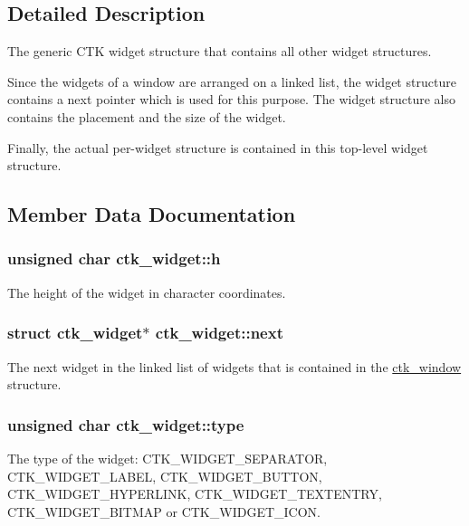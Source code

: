 \subsection{Detailed Description}
The generic C\+T\+K widget structure that contains all other widget structures.

Since the widgets of a window are arranged on a linked list, the widget structure contains a next pointer which is used for this purpose. The widget structure also contains the placement and the size of the widget.

Finally, the actual per-\/widget structure is contained in this top-\/level widget structure. 

\subsection{Member Data Documentation}
\hypertarget{structctk__widget_aceacf7e857117aff2c54a4c7c6441dac}{}
\subsubsection[{h}]{\setlength{\rightskip}{0pt plus 5cm}unsigned char ctk\+\_\+widget\+::h}\label{structctk__widget_aceacf7e857117aff2c54a4c7c6441dac}
The height of the widget in character coordinates. \hypertarget{structctk__widget_a3621ec9de98f2b90ec42cb2833d88423}{}
\subsubsection[{next}]{\setlength{\rightskip}{0pt plus 5cm}struct {\bf ctk\+\_\+widget}$\ast$ ctk\+\_\+widget\+::next}\label{structctk__widget_a3621ec9de98f2b90ec42cb2833d88423}
The next widget in the linked list of widgets that is contained in the \hyperlink{structctk__window}{ctk\+\_\+window} structure. \hypertarget{structctk__widget_a0313c4e5ca0a34104fc5514b6dd8d636}{}
\subsubsection[{type}]{\setlength{\rightskip}{0pt plus 5cm}unsigned char ctk\+\_\+widget\+::type}\label{structctk__widget_a0313c4e5ca0a34104fc5514b6dd8d636}
The type of the widget\+: C\+T\+K\+\_\+\+W\+I\+D\+G\+E\+T\+\_\+\+S\+E\+P\+A\+R\+A\+T\+O\+R, C\+T\+K\+\_\+\+W\+I\+D\+G\+E\+T\+\_\+\+L\+A\+B\+E\+L, C\+T\+K\+\_\+\+W\+I\+D\+G\+E\+T\+\_\+\+B\+U\+T\+T\+O\+N, C\+T\+K\+\_\+\+W\+I\+D\+G\+E\+T\+\_\+\+H\+Y\+P\+E\+R\+L\+I\+N\+K, C\+T\+K\+\_\+\+W\+I\+D\+G\+E\+T\+\_\+\+T\+E\+X\+T\+E\+N\+T\+R\+Y, C\+T\+K\+\_\+\+W\+I\+D\+G\+E\+T\+\_\+\+B\+I\+T\+M\+A\+P or C\+T\+K\+\_\+\+W\+I\+D\+G\+E\+T\+\_\+\+I\+C\+O\+N. \hypertarget{structctk__widget_ad28eb196d37bba6a60b48f4c7e6eb45e}{}
